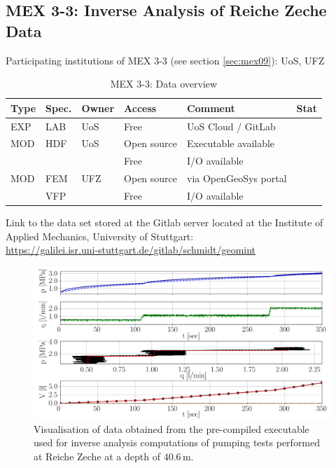 \subsection{MEX 3-3: Inverse Analysis of Reiche Zeche Data}

Participating institutions of MEX 3-3 (see section \ref{sec:mex09}): UoS, UFZ

\begin{table}[ht!]
\caption{MEX 3-3: Data overview}
\label{tab:dms-mex33-overview}
\small
\begin{tabular}{l|l|l|l|L{4.7cm}|l}
\hline
{}
Type & Spec. & Owner & Access     & Comment                       & Stat \\ 
\hline 
EXP  & LAB   & UoS   & Free       & UoS Cloud / GitLab            &  \\
\hline \hline
MOD  & HDF   & UoS   & Open source &  Executable available        &  \\
     &       &       & Free       & I/O available                 &  \\
\hline
MOD  & FEM   & UFZ   & Open source & via OpenGeoSys portal        &  \\
     & VFP   &       & Free        & I/O available                &  \\
%
\hline
\end{tabular}
\end{table}
\normalsize

Link to the data set stored at the Gitlab server located at the Institute of Applied Mechanics, University of Stuttgart:\\
\url{https://galilei.isr.uni-stuttgart.de/gitlab/schmidt/geomint}

\begin{figure}[!ht]
\begin{center}
\includegraphics[width=1.0\textwidth]{./figures/data_management_reiche_zeche_40_6.png}
\end{center}
\caption{Visualisation of data obtained from the pre-compiled executable used for inverse analysis computations of pumping tests performed at Reiche Zeche at a depth of $40.6\,$m.}
\label{fig:DataReicheZeche}
\end{figure}

